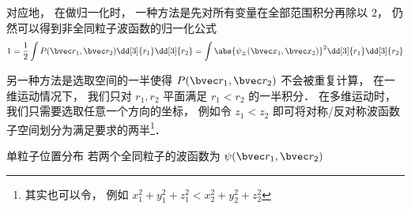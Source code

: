 对应地， 在做归一化时， 一种方法是先对所有变量在全部范围积分再除以 $2$， 仍然可以得到非全同粒子波函数的归一化公式
\begin{equation}
1 = \frac{1}{2}\int P(\bvec r_1, \bvec r_2) \dd[3]{r_1}\dd[3]{r_2} = \int \abs{\psi_\pm(\bvec x_1, \bvec x_2)}^2 \dd[3]{r_1}\dd[3]{r_2}
\end{equation}

另一种方法是选取空间的一半使得 $P(\bvec r_1, \bvec r_2)$ 不会被重复计算， 在一维运动情况下， 我们只对 $r_1, r_2$ 平面满足 $r_1 < r_2$ 的一半积分． 在多维运动时， 我们只需要选取任意一个方向的坐标， 例如令 $z_1 < z_2$ 即可将对称/反对称波函数子空间划分为满足要求的两半\footnote{其实也可以令， 例如 $x_1^2 + y_1^2 + z_1^2 < x_2^2 + y_2^2 + z_2^2$}．

\begin{example}{单粒子位置分布}
若两个全同粒子的波函数为 $\psi(\bvec r_1,\bvec r_2)$
\end{example}
